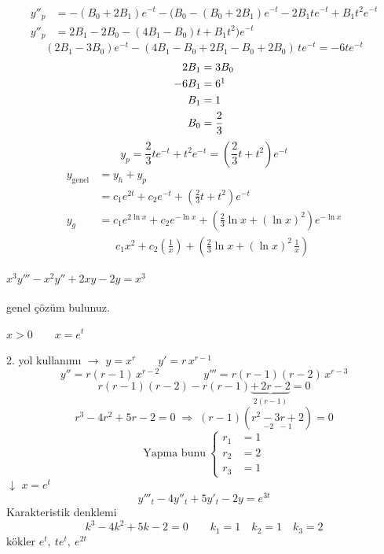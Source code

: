 \documentclass[11pt,a4paper]{article}
\begin{document}
\begin{align*}
y''_p &= -(B_0+2B_1)e^{-t} - (B_0-(B_0+2B_1)e^{-t} - 2B_1te^{-t} + B_1t^2e^{-t}\\
y''_p &= 2B_1 - 2B_0 - (4B_1-B_0)t + B_1t^2)e^{-t}
\end{align*}
\[ (2B_1-3B_0)e^{-t} - (4B_1 - B_0 + 2B_1 - B_0 + 2B_0)\,te^{-t} = -6te^{-t} \]
\begin{align*}
2B_1 &= 3B_0\\
-6B_1 &= 6\footnotemark\\
B_1 &= 1\\
B_0 &= \frac{2}{3}
\end{align*}
\[ y_p = \frac{2}{3}te^{-t} + t^2e^{-t} = \left(\frac{2}{3}t + t^2\right)e^{-t} \]
\begin{align*}
y_{\text{genel}} &= y_h + y_p\\
&= c_1e^{2t} + c_2e^{-t} + \left(\frac{2}{3}t + t^2\right)e^{-t}\\
y_g &= c_1e^{2\ln x} + c_2e^{-\ln x} + \left(\frac{2}{3}\ln x + (\ln x)^2\right)e^{-\ln x}\\
&\phantom{=}\ c_1x^2 + c_2\left(\frac{1}{x}\right) + \left(\frac{2}{3}\ln x + (\ln x)^2\,\frac{1}{x}\right)
\end{align*}

%
\begin{ornek}
$x^3y''' - x^2y'' + 2xy - 2y = x^3$

genel çözüm bulunuz.\textsuperscript{\thefootnote}
\end{ornek}
$x>0 \qquad x=e^t$

2. yol kullanımı $\rightarrow$ \quad $y=x^r \qquad y' = r\,x^{r-1}$
\[ y'' = r(r-1)\,x^{r-2} \qquad\qquad y''' = r(r-1)(r-2)\,x^{r-3} \]
\[ r(r-1)(r-2) - r(r-1) \underbrace{+\,2r-2}_{2(r-1)} = 0 \]
\[ r^3 - 4r^2 + 5r - 2 = 0 \;\Rightarrow\; (r-1)(\underset{-2\ \ \ -1}{r^2-3r+2}) = 0 \]
\[ \text{Yapma bunu}\ \left\{\begin{aligned} r_1 &= 1\\ r_2 &= 2\\ r_3 &= 1 \end{aligned}\right. \]
$\downarrow$ \quad $x=e^t$
\[ y'''_t - 4y''_t + 5y'_t - 2y = e^{3t} \]
Karakteristik denklemi
\[ k^3 - 4k^2 + 5k - 2 = 0 \qquad k_1=1 \quad k_2=1 \quad k_3=2 \]
kökler \qquad $e^t,\ te^t,\ e^{2t}$
\end{document}
